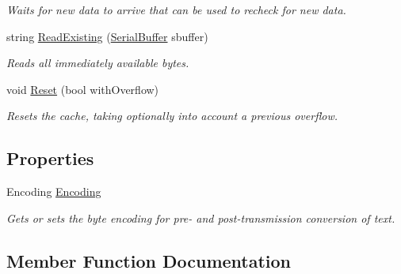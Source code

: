 \begin{DoxyCompactItemize}
\begin{DoxyCompactList}\small\item\em Waits for new data to arrive that can be used to recheck for new data. \end{DoxyCompactList}\item 
string \mbox{\hyperlink{class_r_j_c_p_1_1_i_o_1_1_ports_1_1_native_1_1_read_to_cache_af047055e3cd758c4c52a893c1458c35d}{Read\+Existing}} (\mbox{\hyperlink{class_r_j_c_p_1_1_i_o_1_1_ports_1_1_native_1_1_serial_buffer}{Serial\+Buffer}} sbuffer)
\begin{DoxyCompactList}\small\item\em Reads all immediately available bytes. \end{DoxyCompactList}\item 
void \mbox{\hyperlink{class_r_j_c_p_1_1_i_o_1_1_ports_1_1_native_1_1_read_to_cache_ada7cbbcfb8b96ab3d096ac034eb0c94b}{Reset}} (bool with\+Overflow)
\begin{DoxyCompactList}\small\item\em Resets the cache, taking optionally into account a previous overflow. \end{DoxyCompactList}\end{DoxyCompactItemize}
\subsection*{Properties}
\begin{DoxyCompactItemize}
\item 
Encoding \mbox{\hyperlink{class_r_j_c_p_1_1_i_o_1_1_ports_1_1_native_1_1_read_to_cache_a4ddb8704e3d3d39b40bba23183885700}{Encoding}}
\begin{DoxyCompactList}\small\item\em Gets or sets the byte encoding for pre-\/ and post-\/transmission conversion of text. \end{DoxyCompactList}\end{DoxyCompactItemize}


\subsection{Member Function Documentation}
\mbox{\label{class_r_j_c_p_1_1_i_o_1_1_ports_1_1_native_1_1_read_to_cache_adf52a6068959c7d847f84941b8adfe16}} 
